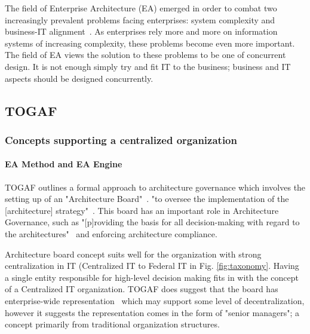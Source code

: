 The field of Enterprise Architecture (EA) emerged in order to combat two increasingly prevalent problems facing enterprises: system complexity and business-IT alignment~\cite{sessions2007}. As enterprises rely more and more on information systems of increasing complexity, these problems become even more important. The field of EA views the solution to these problems to be one of concurrent design. It is not enough simply try and fit IT to the business; business and IT aspects should be designed concurrently.
%
%   
%    

%

\subsection{TOGAF}

\subsubsection{Concepts supporting a centralized organization}

\paragraph*{EA Method and EA Engine}
TOGAF outlines a formal approach to architecture governance which involves the setting up of an "Architecture Board"~\cite{togaf9.1}. "to oversee the implementation of the [architecture] strategy"~\cite{togaf9.1}. This board has an important role in Architecture Governance, such as "[p]roviding the basis for all decision-making with regard to the architectures"~\cite{togaf9.1} and enforcing architecture compliance. 

Architecture board concept suits well for the organization with strong centralization in IT (Centralized IT to Federal IT in Fig. \ref{fig:taxonomy}.  Having a single entity responsible for high-level decision making fits in with the concept of a Centralized IT organization. TOGAF does suggest that the board has enterprise-wide representation~\cite{togaf9.1} which may support some level of decentralization, however it suggests the representation comes in the form of "senior managers"; a concept primarily from traditional organization structures. 

